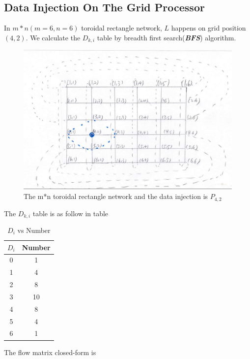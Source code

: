 
\subsection{Data Injection On The Grid Processor}
In $m*n (m = 6,  n = 6)$  toroidal rectangle network, $L$ happens on grid position $(4, 2)$.  We calculate the $D_{k,i}$ table  by breadth first search(\textbf{\textit{BFS}}) algorithm.  

\begin{figure}[!ht]
\centering
\includegraphics[width=1\columnwidth]{figure/rt0.JPG}
\caption{The m*n toroidal rectangle network and the data injection is $P_{4, 2}$}
\label{fig:rt0}
\end{figure}
\newpage 

The $D_{k,i}$ table is as follow in table 
\begin{table}
\centering
\small
\setlength\tabcolsep{2pt}
\begin{tabular}{|c|c|}
\hline
    $D_{i}$ & Number\\ 
    \hline
    0 & 1 \\ \hline
    1 & 4 \\ \hline
    2 & 8\\ \hline
    3 & 10\\ \hline
    4 & 8 \\ \hline
    5 & 4 \\ \hline
    6 & 1\\
\hline
\end{tabular}
\caption{$D_{i}$ vs Number}
\label{tab:rt}
\end{table}


The flow matrix closed-form is 

